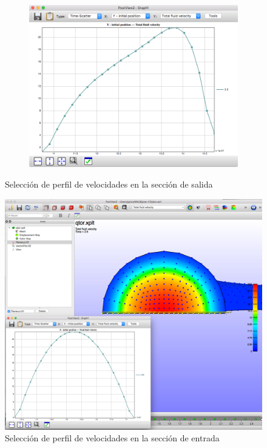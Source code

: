 \begin{figure}[!ht]
\begin{subfigure}[b]{0.25\textwidth}
\caption{}
\label{fig:13_post-profile-out-2}
\end{subfigure}
\begin{subfigure}[b]{0.25\textwidth}
\includegraphics[width=\linewidth]{figuras_4/13_post-profile-out-3.png}
\caption{}
\label{fig:13_post-profile-out-3}
\end{subfigure}
\caption{Selección de perfil de velocidades en la sección de salida}
\label{fig:13_post-profile-out-123}
\end{figure}

\begin{figure}[!ht]
\centering
\includegraphics[width=0.5\linewidth]{figuras_4/14_post-profile-in.png}
\caption{Selección de perfil de velocidades en la sección de entrada}
\label{fig:14_post-profile-in}
\end{figure}

